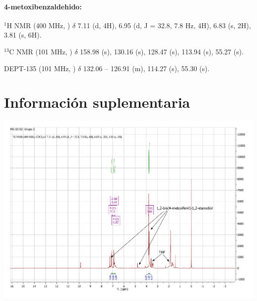 \documentclass[fleqn,11pt]{SelfArx}
\begin{document}
\paragraph{4-metoxibenzaldehido:}
$^1$H NMR (400 MHz, ) $\delta$ 7.11 (d, 4H), 6.95 (d, J = 32.8, 7.8 Hz, 4H), 6.83 (s, 2H), 3.81 (s, 6H).

$^{13}$C NMR (101 MHz, ) $\delta$ 158.98 (s), 130.16 (s), 128.47 (s), 113.94 (s), 55.27 (s).

DEPT-135 (101 MHz, ) $\delta$ 132.06 – 126.91 (m), 114.27 (s), 55.30 (s).


\newpage
\onecolumn
\section{Informaci\'on suplementaria}\label{sec: complementaria}
{
	\begin{minipage}{0.9\textheight}
		\centering
		\includegraphics[height=0.7\textheight]{RMN/H.pdf}
		\label{HHRM}
	\end{minipage}
}
\end{document}
